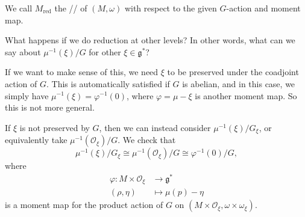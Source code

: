 \documentclass[a4paper]{article}
\newcommand\red{\mathrm{red}}
\begin{document}
\begin{defi}
  We call $M_{\red}$ the // of $(M, \omega)$ with respect to the given $G$-action and moment map.
\end{defi}

What happens if we do reduction at other levels? In other words, what can we say about $\mu^{-1}(\xi)/G$ for other $\xi \in \mathfrak{g}^*$?

If we want to make sense of this, we need $\xi$ to be preserved under the coadjoint action of $G$. This is automatically satisfied if $G$ is abelian, and in this case, we simply have $\mu^{-1}(\xi) = \varphi^{-1}(0)$, where $\varphi = \mu - \xi$ is another moment map. So this is not more general.

If $\xi$ is not preserved by $G$, then we can instead consider $\mu^{-1}(\xi)/G_\xi$, or equivalently take $\mu^{-1}(\mathcal{O}_\xi)/G$. We check that
\[
  \mu^{-1}(\xi)/G_\xi \cong \mu^{-1}(\mathcal{O}_\xi)/G \cong \varphi^{-1}(0)/G,
\]
where
\begin{align*}
  \varphi: M \times \mathcal{O}_\xi &\to \mathfrak{g}^*\\
  (\rho, \eta) &\mapsto \mu(p) - \eta
\end{align*}
is a moment map for the product action of $G$ on $(M \times \mathcal{O}_\xi, \omega \times \omega_\xi)$.
\end{document}
